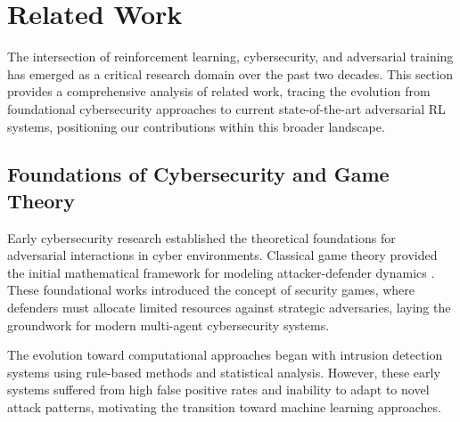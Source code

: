 \documentclass[12pt,twoside]{article}
\begin{document}



\tableofcontents
\clearpage  %

\begin{abstract}
We present a comprehensive experimental investigation into reinforcement learning-based cyber defense optimization using the Cyberwheel cybersecurity simulation environment. This research demonstrates the effectiveness of learned defensive policies compared to traditional approaches through rigorous experimental methodology.
\end{abstract}

\clearpage

\section{Related Work}

The intersection of reinforcement learning, cybersecurity, and adversarial training has emerged as a critical research domain over the past two decades. This section provides a comprehensive analysis of related work, tracing the evolution from foundational cybersecurity approaches to current state-of-the-art adversarial RL systems, positioning our contributions within this broader landscape.

\subsection{Foundations of Cybersecurity and Game Theory}

Early cybersecurity research established the theoretical foundations for adversarial interactions in cyber environments. Classical game theory provided the initial mathematical framework for modeling attacker-defender dynamics \cite{alpcan2010network}. These foundational works introduced the concept of security games, where defenders must allocate limited resources against strategic adversaries, laying the groundwork for modern multi-agent cybersecurity systems.

The evolution toward computational approaches began with intrusion detection systems using rule-based methods and statistical analysis. However, these early systems suffered from high false positive rates and inability to adapt to novel attack patterns, motivating the transition toward machine learning approaches.
\end{document}
